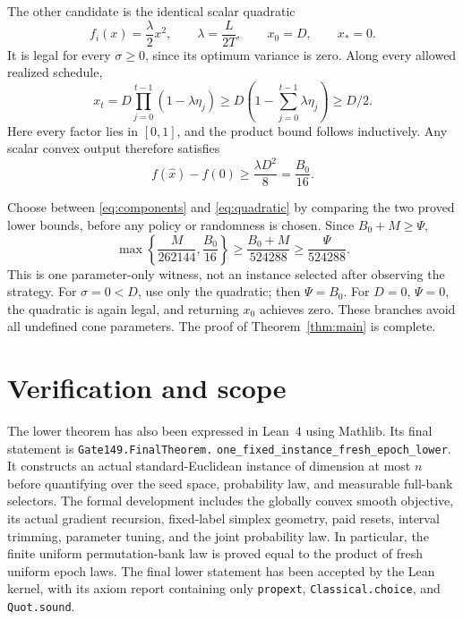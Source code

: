 \documentclass[11pt]{article}
\theoremstyle{remark}
\begin{document}
The other candidate is the identical scalar quadratic
\begin{equation}\label{eq:quadratic}
 f_i(x)=\frac\lambda2x^2,\qquad
 \lambda=\frac{L}{2T},\qquad x_0=D,\qquad x_*=0.
\end{equation}
It is legal for every $\sigma\ge0$, since its optimum variance is
zero. Along every allowed realized schedule,
\[
 x_t=D\prod_{j=0}^{t-1}(1-\lambda\eta_j)
 \ge D\left(1-\sum_{j=0}^{t-1}\lambda\eta_j\right)\ge D/2.
\]
Here every factor lies in $[0,1]$, and the product bound follows
inductively. Any scalar convex output therefore satisfies
\begin{equation}\label{eq:quadratic-risk}
 f(\widehat x)-f(0)\ge\frac{\lambda D^2}{8}=\frac{B_0}{16}.
\end{equation}

Choose between \eqref{eq:components} and \eqref{eq:quadratic} by
comparing the two proved lower bounds, before any policy or randomness
is chosen. Since $B_0+M\ge\Psi$,
\[
 \max\!\left\{\frac{M}{262144},\frac{B_0}{16}\right\}
 \ge\frac{B_0+M}{524288}\ge\frac\Psi{524288}.
\]
This is one parameter-only witness, not an instance selected after
observing the strategy. For $\sigma=0<D$, use only the quadratic;
then $\Psi=B_0$. For $D=0$, $\Psi=0$, the quadratic is again legal,
and returning $x_0$ achieves zero. These branches avoid all undefined
cone parameters. The proof of Theorem~\ref{thm:main} is complete.

\section{Verification and scope}

The lower theorem has also been expressed in Lean~4 using Mathlib.
Its final statement is
\texttt{Gate149.FinalTheorem.}\allowbreak
\texttt{one\_fixed\_instance\_fresh\_epoch\_lower}.
It constructs an actual standard-Euclidean instance of dimension at
most $n$ before quantifying over the seed space, probability law, and
measurable full-bank selectors. The formal development includes the
globally convex smooth objective, its actual gradient recursion,
fixed-label simplex geometry, paid resets, interval trimming, parameter
tuning, and the joint probability law. In particular, the finite uniform
permutation-bank law is proved equal to the product of fresh uniform
epoch laws. The final lower statement has been accepted by the Lean
kernel, with its axiom report containing only \texttt{propext},
\texttt{Classical.choice}, and \texttt{Quot.sound}.
\end{document}
